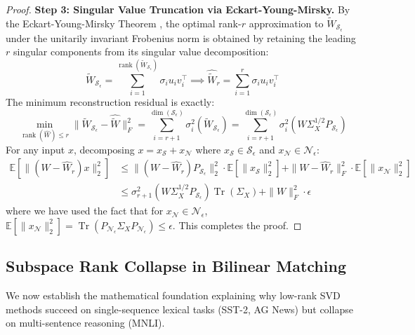 \documentclass{article}
\begin{document}
\begin{proof}
\textbf{Step 3: Singular Value Truncation via Eckart-Young-Mirsky.}
By the Eckart-Young-Mirsky Theorem \citep{eckart1936approximation}, the optimal rank-$r$ approximation to $\tilde{W}_{\mathcal{S}_\epsilon}$ under the unitarily invariant Frobenius norm is obtained by retaining the leading $r$ singular components from its singular value decomposition:
\begin{equation}
    \tilde{W}_{\mathcal{S}_\epsilon} = \sum_{i=1}^{\operatorname{rank}(\tilde{W}_{\mathcal{S}_\epsilon})} \sigma_i u_i v_i^\top \implies \hat{\tilde{W}}_r = \sum_{i=1}^r \sigma_i u_i v_i^\top
\end{equation}
The minimum reconstruction residual is exactly:
\begin{equation}
    \min_{\operatorname{rank}(\hat{W}) \le r} \| \tilde{W}_{\mathcal{S}_\epsilon} - \hat{\tilde{W}} \|_F^2 = \sum_{i=r+1}^{\operatorname{dim}(\mathcal{S}_\epsilon)} \sigma_i^2(\tilde{W}_{\mathcal{S}_\epsilon}) = \sum_{i=r+1}^{\operatorname{dim}(\mathcal{S}_\epsilon)} \sigma_i^2(W \Sigma_X^{1/2} P_{\mathcal{S}_\epsilon})
\end{equation}
For any input $x$, decomposing $x = x_{\mathcal{S}} + x_{\mathcal{N}}$ where $x_{\mathcal{S}} \in \mathcal{S}_\epsilon$ and $x_{\mathcal{N}} \in \mathcal{N}_\epsilon$:
\begin{align}
    \mathbb{E}[\|(W - \hat{W}_r) x\|_2^2] &\le \|(W - \hat{W}_r) P_{\mathcal{S}_\epsilon}\|_2^2 \cdot \mathbb{E}[\|x_{\mathcal{S}}\|_2^2] + \|W - \hat{W}_r\|_F^2 \cdot \mathbb{E}[\|x_{\mathcal{N}}\|_2^2] \nonumber \\
    &\le \sigma_{r+1}^2(W \Sigma_X^{1/2} P_{\mathcal{S}_\epsilon}) \operatorname{Tr}(\Sigma_X) + \|W\|_F^2 \cdot \epsilon
\end{align}
where we have used the fact that for $x_{\mathcal{N}} \in \mathcal{N}_\epsilon$, $\mathbb{E}[\|x_{\mathcal{N}}\|_2^2] = \operatorname{Tr}(P_{\mathcal{N}_\epsilon} \Sigma_X P_{\mathcal{N}_\epsilon}) \le \epsilon$. This completes the proof.
\end{proof}

\subsection{Subspace Rank Collapse in Bilinear Matching}
We now establish the mathematical foundation explaining why low-rank SVD methods succeed on single-sequence lexical tasks (SST-2, AG News) but collapse on multi-sentence reasoning (MNLI).
\end{document}
